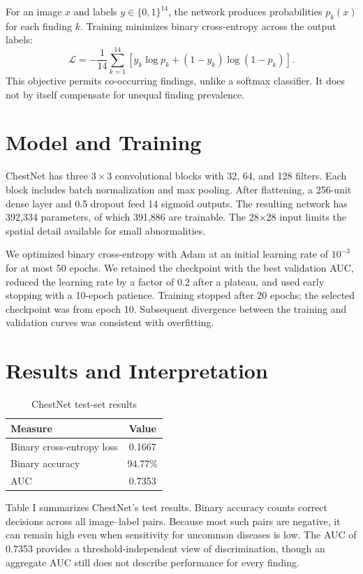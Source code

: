 \documentclass[conference]{IEEEtran}
\begin{document}
For an image $x$ and labels $y\in\{0,1\}^{14}$, the network produces probabilities $p_k(x)$ for each finding $k$. Training minimizes binary cross-entropy across the output labels:
\begin{equation}
\mathcal{L}=-\frac{1}{14}\sum_{k=1}^{14}\left[y_k\log p_k+(1-y_k)\log(1-p_k)\right].
\end{equation}
This objective permits co-occurring findings, unlike a softmax classifier. It does not by itself compensate for unequal finding prevalence.

\section{Model and Training}
ChestNet has three $3\times3$ convolutional blocks with 32, 64, and 128 filters. Each block includes batch normalization and max pooling. After flattening, a 256-unit dense layer and 0.5 dropout feed 14 sigmoid outputs. The resulting network has 392,334 parameters, of which 391,886 are trainable. The 28$\times$28 input limits the spatial detail available for small abnormalities.

We optimized binary cross-entropy with Adam at an initial learning rate of $10^{-3}$ for at most 50 epochs. We retained the checkpoint with the best validation AUC, reduced the learning rate by a factor of 0.2 after a plateau, and used early stopping with a 10-epoch patience. Training stopped after 20 epochs; the selected checkpoint was from epoch 10. Subsequent divergence between the training and validation curves was consistent with overfitting.

\section{Results and Interpretation}
\begin{table}[ht]
\caption{ChestNet test-set results}
\centering
\begin{tabular}{lc}
\hline
Measure & Value \\
\hline
Binary cross-entropy loss & 0.1667 \\
Binary accuracy & 94.77\% \\
AUC & 0.7353 \\
\hline
\end{tabular}
\end{table}
Table I summarizes ChestNet's test results. Binary accuracy counts correct decisions across all image--label pairs. Because most such pairs are negative, it can remain high even when sensitivity for uncommon diseases is low. The AUC of 0.7353 provides a threshold-independent view of discrimination, though an aggregate AUC still does not describe performance for every finding.
\end{document}
